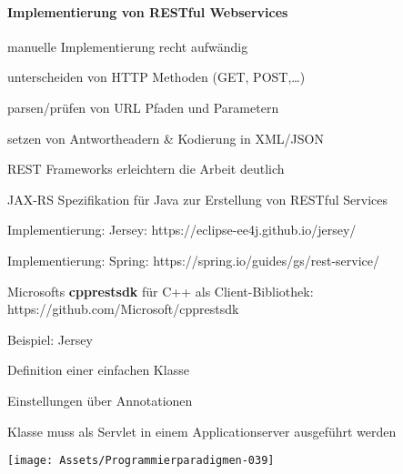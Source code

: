 \documentclass[10pt]{article}
\begin{document}
\paragraph{Implementierung von RESTful Webservices}
\begin{itemize*}
  \item manuelle Implementierung recht aufwändig
  \begin{itemize*}
    \item unterscheiden von HTTP Methoden (GET, POST,…)
    \item parsen/prüfen von URL Pfaden und Parametern
    \item setzen von Antwortheadern \& Kodierung in XML/JSON
  \end{itemize*}
  \item REST Frameworks erleichtern die Arbeit deutlich
  \begin{itemize*}
    \item JAX-RS Spezifikation für Java zur Erstellung von RESTful Services
    \begin{itemize*}
      \item Implementierung: Jersey: https://eclipse-ee4j.github.io/jersey/
      \item Implementierung: Spring:
      https://spring.io/guides/gs/rest-service/
    \end{itemize*}
    \item Microsofts \textbf{cpprestsdk} für C++ als Client-Bibliothek:
    https://github.com/Microsoft/cpprestsdk
  \end{itemize*}
\end{itemize*}
\begin{itemize*}
  \item Beispiel: Jersey
  \item Definition einer einfachen Klasse
  \begin{itemize*}
    \item Einstellungen über Annotationen
    \item Klasse muss als Servlet in einem Applicationserver ausgeführt werden
  \end{itemize*}
\end{itemize*}
\begin{center}
  \centering
  \texttt{[image: Assets/Programmierparadigmen-039]}
\end{center}
\end{document}
